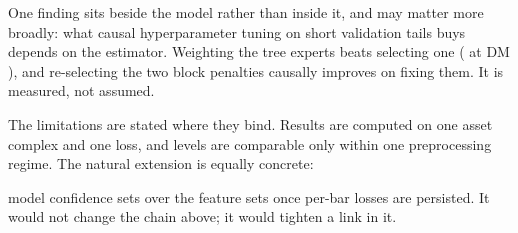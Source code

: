 One finding sits beside the model rather than inside it, and may matter
more broadly: what causal hyperparameter tuning on short validation tails
buys depends on the estimator. Weighting the tree experts beats selecting
one (\unifIncrTreeHedgeDQ{} at DM \unifIncrTreeHedgeDM{}), and re-selecting
the two block penalties causally improves on fixing them. It is measured,
not assumed.

The limitations are stated where they bind. Results are computed on one
asset complex and one loss, and levels are comparable only within one
preprocessing regime. The natural extension is equally concrete:

model confidence sets over
the feature sets once per-bar losses are persisted. It would not change
the chain above; it would tighten a link in it.

